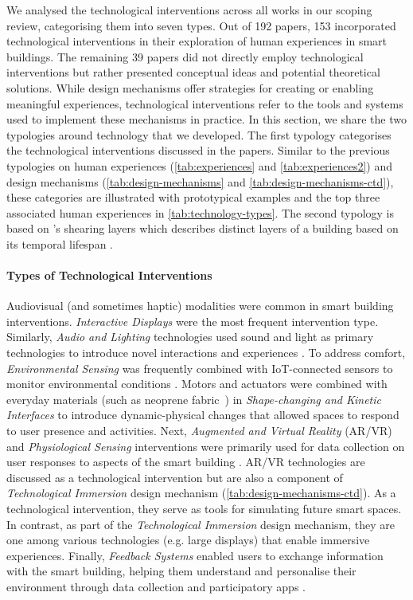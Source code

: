 We analysed the technological interventions across all works in our scoping review, categorising them into seven types. Out of 192 papers, 153 incorporated technological interventions in their exploration of human experiences in smart buildings. The remaining 39 papers did not directly employ technological interventions but rather presented conceptual ideas and potential theoretical solutions. While design mechanisms offer strategies for creating or enabling meaningful experiences, technological interventions refer to the tools and systems used to implement these mechanisms in practice.  In this section, we share the two typologies around technology that we developed. The first typology categorises the technological interventions discussed in the papers. Similar to the previous typologies on human experiences (\autoref{tab:experiences} and \autoref{tab:experiences2}) and design mechanisms (\autoref{tab:design-mechanisms} and \autoref{tab:design-mechanisms-ctd}), these categories are illustrated with prototypical examples and the top three associated human experiences in \autoref{tab:technology-types}. The second typology is based on \citet{brand1995buildings}'s shearing layers which describes distinct layers of a building based on its temporal lifespan \cite{brand1995buildings}.   

\paragraph{Types of Technological Interventions}
Audiovisual (and sometimes haptic) modalities were common in smart building interventions. \textit{Interactive Displays} were the most frequent intervention type. Similarly, \textit{Audio and Lighting} technologies used sound and light as primary technologies to introduce novel interactions and experiences \cite{andres2023human}. To address comfort, \textit{Environmental Sensing} was frequently combined with IoT-connected sensors to monitor environmental conditions \cite{constantinides2020comfeel}. Motors and actuators were combined with everyday materials (such as neoprene fabric~\cite{economidou2021no}) in \textit{Shape-changing and Kinetic Interfaces} to introduce dynamic-physical changes that allowed spaces to respond to user presence and activities. Next, \textit{Augmented and Virtual Reality} (AR/VR) and \textit{Physiological Sensing} interventions were primarily used for data collection on user responses to aspects of the smart building \cite{angioletti2020neurophysiological, burova2019promoting}. AR/VR technologies are discussed as a technological intervention but are also a component of \textit{Technological Immersion} design mechanism (\autoref{tab:design-mechanisms-ctd}). As a technological intervention, they serve as tools for simulating future smart spaces. In contrast, as part of the \textit{Technological Immersion} design mechanism, they are one among various technologies (e.g. large displays) that enable immersive experiences. Finally, \textit{Feedback Systems} enabled users to exchange information with the smart building, helping them understand and personalise their environment through data collection and participatory apps \cite{mitchell2018spacebot}.


